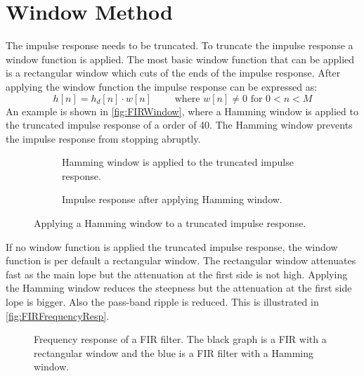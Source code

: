\section{Window Method}
The impulse response needs to be truncated. To truncate the impulse response a window function is applied. The most basic window function that can be applied is a rectangular window which cuts of the ends of the impulse response. After applying the window function the impulse response can be expressed as:
\begin{equation}
h[n]=h_d[n]\cdot w[n]\qquad\textrm{ where } w[n]\neq0 \textrm{ for } 0<n<M
\end{equation}
An example is shown in \autoref{fig:FIRWindow}, where a Hamming window is applied to the truncated impulse response of a order of 40. The Hamming window prevents the impulse response from stopping abruptly.

\begin{figure}[H]
\centering
\begin{subfigure}[t]{0.45\textwidth}
    \centering
    
    \caption{Hamming window is applied to the truncated impulse response.}
    \label{fig:FIRTruncation}
\end{subfigure}
\begin{subfigure}[t]{0.45\textwidth}
    \centering
    
    \caption{Impulse response after applying Hamming window.}
    \label{fig:FIRHamming}
\end{subfigure}
\caption{Applying a Hamming window to a truncated impulse response.}
\label{fig:FIRWindow}
\end{figure} 
If no window function is applied the truncated impulse response, the window function is per default a rectangular window. The rectangular window attenuates fast as the main lope but the attenuation at the first side is not high. Applying the Hamming window reduces the steepness but the attenuation at the first side lope is bigger. Also the pass-band ripple is reduced. This is illustrated in \autoref{fig:FIRFrequencyResp}.

\begin{figure}[H]
    \centering
    
    \caption{Frequency response of a FIR filter. The black graph is a FIR with a rectangular window and the blue is a FIR filter with a Hamming window.}
\label{fig:FIRFrequencyResp}
\end{figure}  

